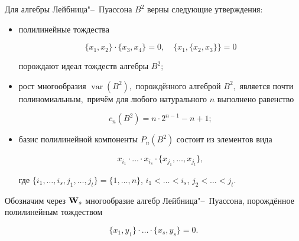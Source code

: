 \smallskip



\begin{theorem}

Для алгебры Лейбница"--~Пуассона $B^2$ верны следующие утверждения\/$:$



\begin{itemize}



\item[\rm (i)] полилинейные тождества

$$

\{x_1,x_2\}\cdot\{x_3,x_4\}=0,\quad  \{x_1,\{x_2,x_3\}\}=0

$$

порождают идеал тождеств алгебры $B^2;$



\item[\rm (ii)] рост многообразия $\mathop{var}(B^2),$ порождённого алгеброй $B^2,$ является почти полиномиальным$,$ причём для любого натурального $n$ выполнено равенство

$$

c_n(B^2) = n\cdot 2^{n-1}-n+1;

$$



\item[\rm (iii)] базис полилинейной компоненты $P_n(B^2)$ состоит из элементов вида

$$

x_{i_1}\cdot \dots \cdot x_{i_s}\cdot \{x_{j_1}, \dots ,x_{j_t}\},

$$

где $\{i_1, \dots ,i_s,j_1, \dots ,j_t\}=\{1, \dots ,n\}$, $i_1< \dots <i_s$, $j_2< \dots <j_t.$

\end{itemize}

\end{theorem}



\smallskip



Обозначим через ${\bf W}_s$ многообразие алгебр Лейбница"--~Пуассона, порождённое полилинейным тождеством

$$

\{x_1,y_1\}\cdot \dots \cdot \{x_s,y_s\} = 0.

$$



\smallskip





